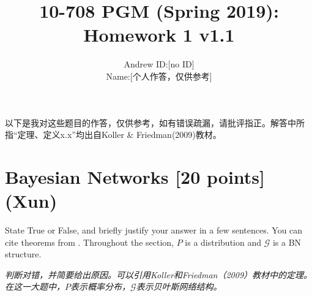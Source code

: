 \documentclass[12pt]{article}
\title{10-708 PGM (Spring 2019): Homework 1
{\color{red} v1.1}
}
\author{
\begin{tabular}{rl}
Andrew ID: & [no ID] \\
Name: & [个人作答，仅供参考] 
\end{tabular}
}
\date{}
\newcommand{\Gcal}{\mathcal{G}}
\begin{document}
\maketitle

以下是我对这些题目的作答，仅供参考，如有错误疏漏，请批评指正。解答中所指“定理、定义x.x”均出自Koller \& Friedman(2009)教材。
\section{Bayesian Networks [20 points] (Xun)}

State True or False, and briefly justify your answer in a few sentences. You can cite theorems from \citet{koller2009probabilistic}. Throughout the section, $P$ is a distribution and $\Gcal$ is a BN structure.

\textit{判断对错，并简要给出原因。可以引用Koller和Friedman（2009）教材中的定理。在这一大题中，$P$表示概率分布，$\Gcal$表示贝叶斯网络结构。}
\end{document}

